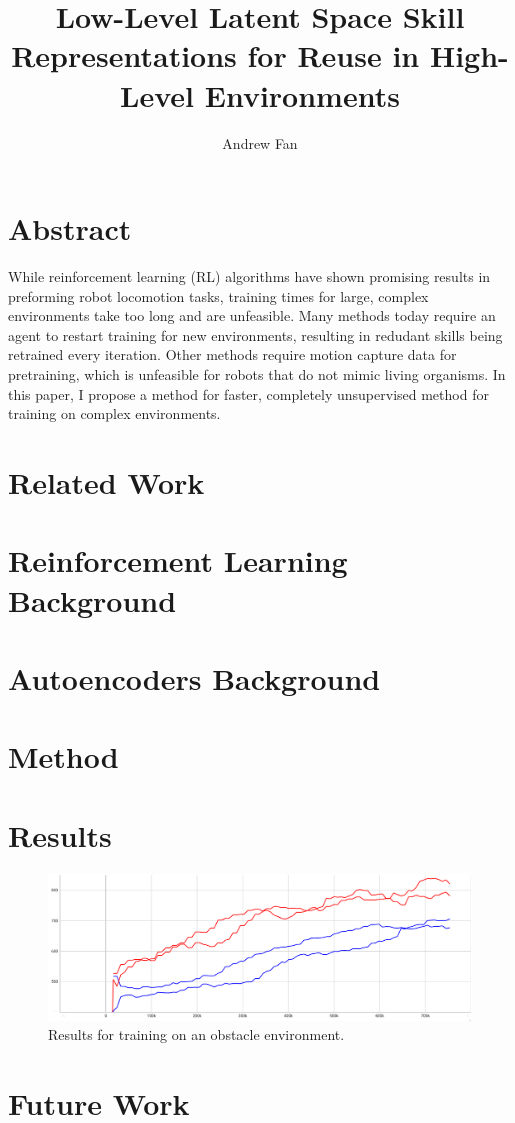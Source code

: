 \documentclass[a4paper]{article}
\title{Low-Level Latent Space Skill Representations for Reuse in High-Level Environments}
\author{Andrew Fan}
\begin{document}
\maketitle
\section{Abstract}
\hspace{10mm} While reinforcement learning (RL) algorithms have shown promising results in preforming robot locomotion tasks,
training times for large, complex environments take too long and are unfeasible. Many methods today require 
an agent to restart training for new environments, resulting in redudant skills being retrained every iteration.
Other methods require motion capture data for pretraining, which is unfeasible for robots that do not mimic living organisms.
In this paper, I propose a method for faster, completely unsupervised method for training on complex environments.

\section{Related Work}


\section{Reinforcement Learning Background}
\section{Autoencoders Background}
\section{Method}

\section{Results}
\begin{figure}[h]
\centering
\includegraphics[width=1\linewidth]{./figs/obstacle-scratch-vs-autoencoder.png}
\caption{Results for training on an obstacle environment.}
\end{figure}

\section{Future Work}

\printbibliography
\end{document}
